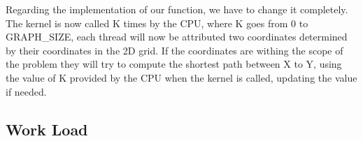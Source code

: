\documentclass[runningheads]{llncs}
\begin{document}
Regarding the implementation of our function, we have to change it completely.
The kernel is now called K times by the CPU, where K goes from 0 to GRAPH\_SIZE, 
each thread will now be attributed two coordinates determined by their coordinates in the 2D grid. 
If the coordinates are withing the scope of the problem they will try to compute the shortest path between X to Y, using the value of K provided by the CPU when the kernel is called, updating the value if needed. 

\subsection{Work Load}
\end{document}
